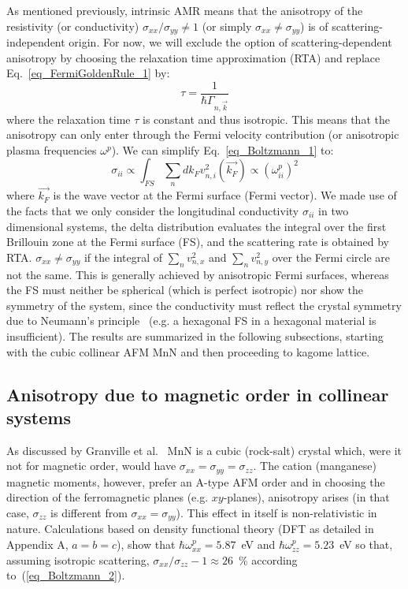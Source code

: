 \documentclass[prb,showpacs,amsmath,amssymb,superscriptaddress,twocolumn,floatfix]{revtex4-1}
\begin{document}
As mentioned previously, intrinsic AMR means that the anisotropy of
the resistivity (or conductivity) $\sigma_{xx} / \sigma_{yy} \neq 1$
(or simply $\sigma_{xx} \neq \sigma_{yy}$) is of
scattering-independent origin. For now, we will exclude the option of scattering-dependent anisotropy by choosing the relaxation time approximation (RTA)\cite{Vyborny:2009_a} and replace Eq.~\ref{eq_FermiGoldenRule_1} by:
\begin{equation}
	\tau = \frac{1}{\hbar \Gamma_{n, \vec{k}}}
\end{equation}
where the relaxation time $\tau$ is constant and thus isotropic. This
means that the anisotropy can only enter through the Fermi velocity
contribution (or anisotropic plasma frequencies $\omega^p$). We can simplify Eq.~\ref{eq_Boltzmann_1} to:
%
\begin{equation}
	\sigma_{ii} \propto \int_ {FS} \sum_n   dk_F  v^2_{n,i}(\vec{k_F})
        \propto (\omega_{ii}^p)^2
	\label{eq_Boltzmann_2}
\end{equation}
%
where $\vec{k_F}$ is the wave vector at the Fermi surface (Fermi
vector).
We made use of the facts that we only consider the
longitudinal conductivity $\sigma_{ii}$ in two dimensional systems,
the delta distribution evaluates the integral over the first Brillouin
zone at the Fermi surface (FS), and the scattering rate is obtained by
RTA. $\sigma_{xx} \neq \sigma_{yy}$ if the integral of $\sum_n
v^2_{n,x}$ and $\sum_n v^2_{n,y}$ over the Fermi circle are not the
same. This is generally achieved by anisotropic Fermi surfaces,
whereas the FS must neither be spherical (which is perfect isotropic)
nor show the symmetry of the system, since the conductivity must
reflect the crystal symmetry due to Neumann's
principle~\cite{Ritzinger:2021} (e.g. a hexagonal FS in a hexagonal
material is insufficient). The results are summarized in the following
subsections, starting with the cubic collinear AFM MnN and
then proceeding to kagome lattice.

\subsection{Anisotropy due to magnetic order in collinear systems}

As discussed by Granville et al.~\cite{g} %
MnN is a cubic
(rock-salt) crystal which, were it not for magnetic order, would have
$\sigma_{xx}=\sigma_{yy}=\sigma_{zz}$. The cation (manganese)
magnetic moments, however, prefer an A-type AFM order and in choosing
the direction of the ferromagnetic planes (e.g. $xy$-planes),
anisotropy arises (in that case, $\sigma_{zz}$ is different from
$\sigma_{xx}=\sigma_{yy}$). This effect in itself is non-relativistic in nature.
Calculations based on density functional theory (DFT as 
detailed in Appendix A, $a=b=c$), show that
$\hbar\omega^p_{xx}=5.87$~eV and $\hbar\omega^p_{zz}=5.23$~eV so that,
assuming isotropic scattering, $\sigma_{xx}/\sigma_{zz}-1\approx 26$~\%
according to~(\ref{eq_Boltzmann_2}).
\end{document}
